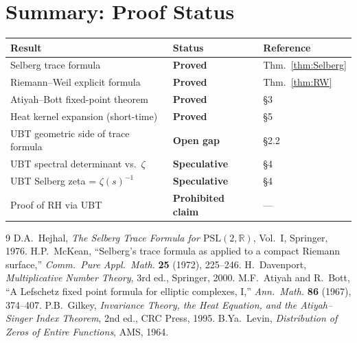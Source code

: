 \documentclass[11pt,a4paper]{article}
\begin{document}
\section{Summary: Proof Status}

\begin{center}
\begin{tabular}{lll}
\hline
Result & Status & Reference \\
\hline
Selberg trace formula & \textbf{Proved} & Thm.~\ref{thm:Selberg} \\
Riemann--Weil explicit formula & \textbf{Proved} & Thm.~\ref{thm:RW} \\
Atiyah--Bott fixed-point theorem & \textbf{Proved} & §3 \\
Heat kernel expansion (short-time) & \textbf{Proved} & §5 \\
UBT geometric side of trace formula & \textbf{Open gap} & §2.2 \\
UBT spectral determinant vs.\ $\zeta$ & \textbf{Speculative} & §4 \\
UBT Selberg zeta = $\zeta(s)^{-1}$ & \textbf{Speculative} & §4 \\
Proof of RH via UBT & \textbf{Prohibited claim} & --- \\
\hline
\end{tabular}
\end{center}

\begin{thebibliography}{9}
 D.A.\ Hejhal, \emph{The Selberg Trace Formula for $\mathrm{PSL}(2,\mathbb{R})$},
  Vol.\ I, Springer, 1976.
 H.P.\ McKean, ``Selberg's trace formula as applied to a compact
  Riemann surface,'' \emph{Comm.\ Pure Appl.\ Math.} \textbf{25} (1972), 225--246.
 H.\ Davenport, \emph{Multiplicative Number Theory},
  3rd ed., Springer, 2000.
 M.F.\ Atiyah and R.\ Bott, ``A Lefschetz fixed point formula
  for elliptic complexes, I,'' \emph{Ann.\ Math.} \textbf{86} (1967), 374--407.
 P.B.\ Gilkey, \emph{Invariance Theory, the Heat Equation, and
  the Atiyah--Singer Index Theorem}, 2nd ed., CRC Press, 1995.
 B.Ya.\ Levin, \emph{Distribution of Zeros of Entire Functions},
  AMS, 1964.
\end{thebibliography}
\end{document}
